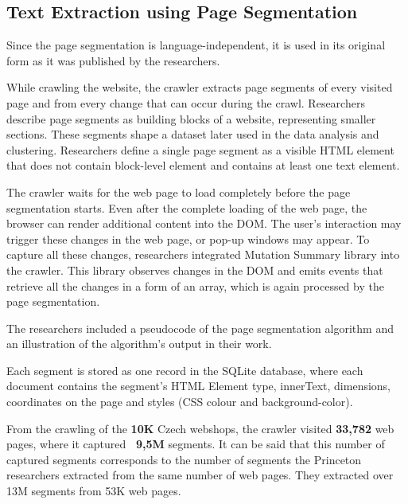         \subsection{Text Extraction using Page Segmentation}
        \label{section:text-extraction}
        Since the page segmentation is language-independent, it is used in its original form as it was published by the researchers. 
        
        While crawling the website, the crawler extracts page segments of every visited page and from every change that can occur during the crawl. Researchers describe page segments as building blocks of a website, representing smaller sections. These segments shape a dataset later used in the data analysis and clustering. Researchers define\cite{dark-patterns-at-scale} a single page segment as a visible HTML element that does not contain block-level element\cite{block-element} and contains at least one text element\cite{text-element}. 
        
        The crawler waits for the web page to load completely before the page segmentation starts. Even after the complete loading of the web page, the browser can render additional content into the DOM. The user's interaction may trigger these changes in the web page, or pop-up windows may appear. To capture all these changes, researchers integrated Mutation Summary \cite{mutation-summary} library into the crawler. This library observes changes in the DOM and emits events that retrieve all the changes in a form of an array, which is again processed by the page segmentation.

        The researchers included a pseudocode of the page segmentation algorithm and an illustration of the algorithm's output in their work\cite{dark-patterns-at-scale}.

        Each segment is stored as one record in the SQLite database, where each document contains the segment's HTML Element type, innerText, dimensions, coordinates on the page and styles (CSS colour and background-color).

        From the crawling of the \textbf{10K} Czech webshops, the crawler visited \textbf{33,782} web pages, where it captured \textbf{~9,5M} segments. It can be said that this number of captured segments corresponds to the number of segments the Princeton researchers extracted from the same number of web pages. They extracted over 13M segments from 53K web pages.

